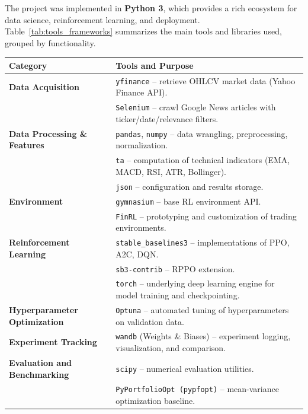 \documentclass[12pt,a4paper]{report}
\begin{document}
The project was implemented in \textbf{Python 3}, which provides a rich ecosystem for data science, reinforcement learning, and deployment. 
Table~\ref{tab:tools_frameworks} summarizes the main tools and libraries used, grouped by functionality.
\begin{table}[H]
\centering
\renewcommand{\arraystretch}{1.3} %
\begin{tabular}{p{4cm} p{10cm}}
\hline
\textbf{Category} & \textbf{Tools and Purpose} \\
\hline

\textbf{Data Acquisition} 
 & \texttt{yfinance} -- retrieve OHLCV market data (Yahoo Finance API). \\
 & \texttt{Selenium} -- crawl Google News articles with ticker/date/relevance filters. \\[0.5em]

\textbf{Data Processing \& Features} 
 & \texttt{pandas}, \texttt{numpy} -- data wrangling, preprocessing, normalization. \\
 & \texttt{ta} -- computation of technical indicators (EMA, MACD, RSI, ATR, Bollinger). \\
 & \texttt{json} -- configuration and results storage. \\[0.5em]

\textbf{Environment} 
 & \texttt{gymnasium} -- base RL environment API. \\
 & \texttt{FinRL} -- prototyping and customization of trading environments. \\[0.5em]

\textbf{Reinforcement Learning} 
 & \texttt{stable\_baselines3} -- implementations of PPO, A2C, DQN. \\
 & \texttt{sb3-contrib} -- RPPO extension. \\
 & \texttt{torch} -- underlying deep learning engine for model training and checkpointing. \\[0.5em]

\textbf{Hyperparameter Optimization} 
 & \texttt{Optuna} -- automated tuning of hyperparameters on validation data. \\[0.5em]

\textbf{Experiment Tracking} 
 & \texttt{wandb} (Weights \& Biases) -- experiment logging, visualization, and comparison. \\[0.5em]

\textbf{Evaluation and Benchmarking} 
 & \texttt{scipy} -- numerical evaluation utilities. \\
 & \texttt{PyPortfolioOpt (pypfopt)} -- mean-variance optimization baseline. \\[0.5em]


\end{tabular}
\end{table}
\end{document}

